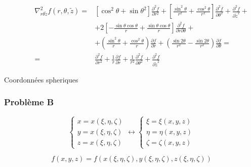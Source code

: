 \documentclass
[
a4paper,                      %
twoside,					  %
12pt,                         %
abstract,		      %
fleqn,                        %
]
{scrartcl} %
\begin{document}
\begin{description}
\begin{equation}
\begin{aligned}
\nabla_{r\theta\tilde{z}}^{2}f\left(r,\theta,\tilde{z}\right)=&\left[\cos^{2}{\theta}+\sin{\theta}^{2}\right]\frac{\partial^{2} f}{\partial r^{2}}+\left[\frac{\sin^{2}{\theta}}{r^{2}}+\frac{\cos^{2}{\theta}}{r^{2}}\right]\frac{\partial^{2} f}{\partial\theta^{2}}+\frac{\partial^{2} f}{\partial\tilde{z}^{2}}+\\[5pt]
&+2\left[-\frac{\sin{\theta}\cos{\theta}}{r}+\frac{\sin{\theta}\cos{\theta}}{r}\right]\frac{\partial^{2} f}{\partial r\partial\theta}+\\[5pt]
&+\left(\frac{\sin^{2}{\theta}}{r}+\frac{\cos^{2}{\theta}}{r}\right)\frac{\partial f}{\partial r}+\left(\frac{\sin{2\theta}}{r^{2}}-\frac{\sin{2\theta}}{r^{2}}\right)\frac{\partial f}{\partial\theta}=\\[5pt]
=&\frac{\partial^{2} f}{\partial r^{2}}+\frac{1}{r}\frac{\partial f}{\partial r}+\frac{1}{r^{2}}\frac{\partial^{2} f}{\partial\theta^{2}}+\frac{\partial^{2} f}{\partial\tilde{z}^{2}}
\end{aligned}
\end{equation}

\item[Coordonn\'ees spheriques]
\end{description}

\subsubsection{Probl\`eme B}

\begin{equation}
\begin{cases}
x=x\left(\xi,\eta,\zeta\right)\\
y=x\left(\xi,\eta,\zeta\right)\\
z=x\left(\xi,\eta,\zeta\right)
\end{cases}\longleftrightarrow\begin{cases}
\xi=\xi\left(x,y,z\right)\\
\eta=\eta\left(x,y,z\right)\\
\zeta=\zeta\left(x,y,z\right)
\end{cases}
\end{equation}

\begin{equation}
f\left(x,y,z\right)=f\left(x\left(\xi,\eta,\zeta\right),y\left(\xi,\eta,\zeta\right),z\left(\xi,\eta,\zeta\right)\right)
\end{equation}
\end{document}
